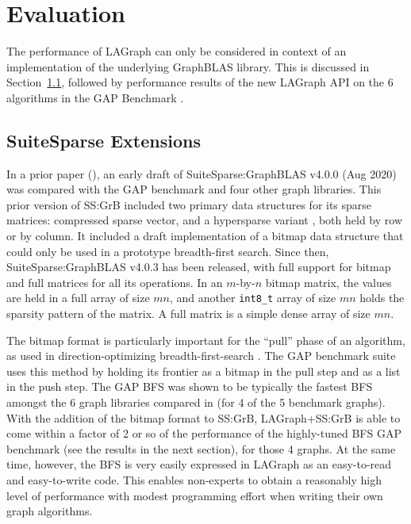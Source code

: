 \section{Evaluation}
\label{sec:evaluation}

The performance of LAGraph can only be considered in context of an
implementation of the underlying GraphBLAS library.  This is discussed in
Section~\ref{sec:extensions}, followed by performance results of the new
LAGraph API on the 6 algorithms in the GAP Benchmark
\cite{DBLP:conf/sc/BeamerAP12}.

\subsection{SuiteSparse Extensions}
\label{sec:extensions}

In a prior paper (\cite{DBLP:conf/iiswc/AzadABBCDDDDFGG20}), an early draft of
SuiteSparse:GraphBLAS v4.0.0 (Aug 2020) was compared with the GAP benchmark
\cite{DBLP:conf/sc/BeamerAP12} and four other graph libraries.  This prior
version of SS:GrB included two primary data structures for its sparse matrices:
compressed sparse vector, and a hypersparse variant
\cite{DBLP:conf/ipps/BulucG08}, both held by row or by column.  It included a
draft implementation of a bitmap data structure that could only be used in a
prototype breadth-first search.  Since then, SuiteSparse:GraphBLAS v4.0.3 has
been released, with full support for bitmap and full matrices for all its
operations.  In an $m$-by-$n$ bitmap matrix, the values are held in a full
array of size $mn$, and another \verb'int8_t' array of size $mn$ holds the
sparsity pattern of the matrix.  A full matrix is a simple dense array of size
$mn$.

The bitmap format is particularly important for the ``pull'' phase of an
algorithm, as used in direction-optimizing breadth-first-search
\cite{DBLP:conf/sc/BeamerAP12,DBLP:conf/icpp/YangBO18}.  The GAP benchmark suite uses this method by
holding its frontier as a bitmap in the pull step and as a list in the push
step. The GAP BFS was shown to be typically the fastest BFS amongst the 6 graph
libraries compared in \cite{DBLP:conf/iiswc/AzadABBCDDDDFGG20} (for 4 of the 5
benchmark graphs).  With the addition of the bitmap format to SS:GrB,
LAGraph+SS:GrB is able to come within a factor of 2 or so of the performance of
the highly-tuned BFS GAP benchmark (see the results in the next section), for
those 4 graphs.  At the same time, however, the BFS is very easily expressed in
LAGraph as an easy-to-read and easy-to-write code.  This enables non-experts to
obtain a reasonably high level of performance with modest programming effort
when writing their own graph algorithms.

